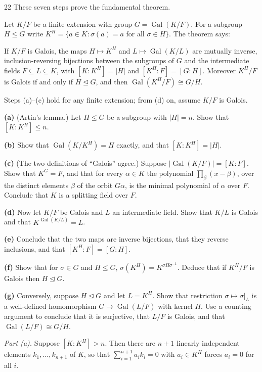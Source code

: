 \documentclass[11pt]{article}
\begin{document}
\begin{problem}{22}
These seven steps prove the fundamental theorem.

Let $K/F$ be a finite extension with group $G=\operatorname{Gal}(K/F)$. For a subgroup $H\le G$ write $K^H=\{a\in K:\sigma(a)=a\text{ for all }\sigma\in H\}$. The theorem says:

If $K/F$ is Galois, the maps $H\mapsto K^H$ and $L\mapsto\operatorname{Gal}(K/L)$ are mutually inverse, inclusion-reversing bijections between the subgroups of $G$ and the intermediate fields $F\subseteq L\subseteq K$, with $[K:K^H]=|H|$ and $[K^H:F]=[G:H]$. Moreover $K^H/F$ is Galois if and only if $H\unlhd G$, and then $\operatorname{Gal}(K^H/F)\cong G/H$.

Steps (a)--(c) hold for any finite extension; from (d) on, assume $K/F$ is Galois.

\textbf{(a)} (Artin's lemma.) Let $H\le G$ be a subgroup with $|H|=n$. Show that $[K:K^H]\le n$.

\textbf{(b)} Show that $\operatorname{Gal}(K/K^H)=H$ exactly, and that $[K:K^H]=|H|$.

\textbf{(c)} (The two definitions of ``Galois'' agree.) Suppose $|\operatorname{Gal}(K/F)|=[K:F]$. Show that $K^G=F$, and that for every $\alpha\in K$ the polynomial $\prod_\beta(x-\beta)$, over the distinct elements $\beta$ of the orbit $G\alpha$, is the minimal polynomial of $\alpha$ over $F$. Conclude that $K$ is a splitting field over $F$.

\textbf{(d)} Now let $K/F$ be Galois and $L$ an intermediate field. Show that $K/L$ is Galois and that $K^{\operatorname{Gal}(K/L)}=L$.

\textbf{(e)} Conclude that the two maps are inverse bijections, that they reverse inclusions, and that $[K^H:F]=[G:H]$.

\textbf{(f)} Show that for $\sigma\in G$ and $H\le G$, $\sigma(K^H)=K^{\sigma H\sigma^{-1}}$. Deduce that if $K^H/F$ is Galois then $H\unlhd G$.

\textbf{(g)} Conversely, suppose $H\unlhd G$ and let $L=K^H$. Show that restriction $\sigma\mapsto\sigma|_L$ is a well-defined homomorphism $G\to\operatorname{Gal}(L/F)$ with kernel $H$. Use a counting argument to conclude that it is surjective, that $L/F$ is Galois, and that $\operatorname{Gal}(L/F)\cong G/H$.
\end{problem}
\emph{Part (a).} Suppose $[K:K^H]>n$. Then there are $n+1$ linearly independent elements $k_1,\dots,k_{n+1}$ of $K$, so that $\sum_{i=1}^{n+1}a_ik_i=0$ with $a_i\in K^H$ forces $a_i=0$ for all $i$.
\end{document}
